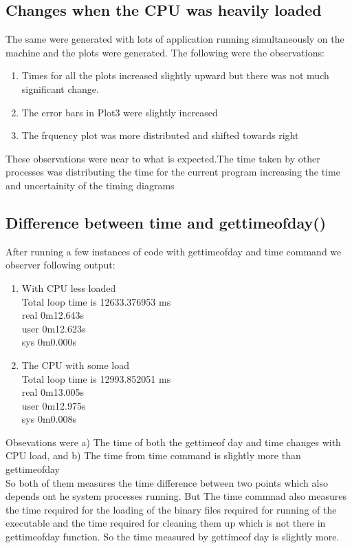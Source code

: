 \documentclass[11pt,]{article}
\begin{document}
\begin{singlespace}
\subsection{Changes when the CPU was heavily loaded}
The same were generated with lots of application running simultaneously on the machine and the plots were generated. 
The following were the observations:
\begin{enumerate}
    \item Times for all the plots increased slightly upward but there was not much significant change. 
    \item The error bars in Plot3 were slightly increased
    \item The frquency plot was more distributed and shifted towards right
\end{enumerate}
These observations were near to what is expected.The time taken by other processes was distributing the time for the current program increasing
the time and uncertainity of the timing diagrams
\subsection{Difference between time and gettimeofday()}
After running a few instances of code with gettimeofday and time command we observer following output:
\begin{enumerate}
    \item With CPU less loaded\\
		Total loop time is 12633.376953 ms\\
		real	0m12.643s\\
		user	0m12.623s\\
		sys	0m0.000s
    \item The CPU with some load\\
		Total loop time is 12993.852051 ms\\
		real	0m13.005s\\
		user	0m12.975s\\
		sys	0m0.008s
\end{enumerate}
Obsevations were a) The time of both the gettimeof day and time changes with CPU load, and b) The time from time command is slightly more than
gettimeofday \\

So both of them measures the time difference between two points which also depends ont he system processes running. But The time commnad also measures 
the time required for the loading of the binary files required for running of the executable and the time required for cleaning them up which is 
not there in gettimeofday function. So the time measured by gettimeof day is slightly more.




\end{singlespace}
\end{document}
